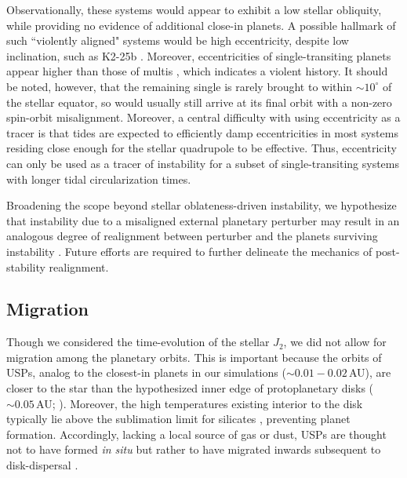 \documentclass[twocolumn]{aastex63}
\begin{document}
Observationally, these systems would appear to exhibit a low stellar obliquity, while providing no evidence of additional close-in planets. A possible hallmark of such ``violently aligned" systems would be high eccentricity, despite low inclination, such as K2-25b \citep{gaidos2020zodiacal,stefansson2020habitable}. Moreover, eccentricities of single-transiting planets appear higher than those of multis \citep{xie2016exoplanet,van2019orbital}, which indicates a violent history. It should be noted, however, that the remaining single is rarely brought to within $\sim10^\circ$ of the stellar equator, so would usually still arrive at its final orbit with a non-zero spin-orbit misalignment. Moreover, a central difficulty with using eccentricity as a tracer is that tides are expected to efficiently damp eccentricities in most systems residing close enough for the stellar quadrupole to be effective. Thus, eccentricity can only be used as a tracer of instability for a subset of single-transiting systems with longer tidal circularization times.

Broadening the scope beyond stellar oblateness-driven instability, we hypothesize that instability due to a misaligned external planetary perturber may result in an analogous degree of realignment between perturber and the planets surviving instability \citep{lai2017hiding,hansen2017perturbation}. Future efforts are required to further delineate the mechanics of post-stability realignment. 

\subsection{Migration}

Though we considered the time-evolution of the stellar $J_2$, we did not allow for migration among the planetary orbits. This is important because the orbits of USPs, analog to the closest-in planets in our simulations ($\sim0.01-0.02\,$AU), are closer to the star than the hypothesized inner edge of protoplanetary disks ($\sim 0.05\,$AU; \citealt{armitage1996magnetic,dullemond2010inner}). Moreover, the high temperatures existing interior to the disk typically lie above the sublimation limit for silicates \citep{flock2019planet}, preventing planet formation. Accordingly, lacking a local source of gas or dust, USPs are thought not to have formed \textit{in situ} but rather to have migrated inwards subsequent to disk-dispersal \citep{lee2017magnetospheric,winn2018kepler,petrovich2019ultra,millholland2020formation}. 
\end{document}

